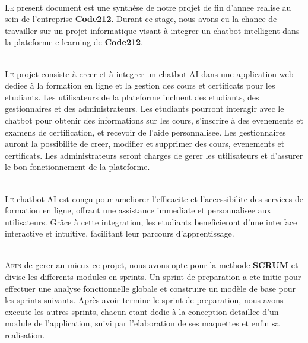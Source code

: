 \documentclass[a4paper, 11pt, openany]{report}
\begin{document}
\ \\







\Newpage


\lettrine[nindent=0em, slope=-.5em]{\color{Eblue}L}{e} present document est une synthèse de notre projet de fin d’annee realise au sein de l'entreprise \textbf{Code212}. Durant ce stage, nous avons eu la chance de travailler sur un projet informatique visant à integrer un chatbot intelligent dans la plateforme e-learning de \textbf{Code212}.

\ \\

\lettrine[nindent=0em, slope=-.5em]{\color{Eblue}L}{e} projet consiste à creer et à integrer un chatbot AI dans une application web dediee à la formation en ligne et la gestion des cours et certificats pour les etudiants. Les utilisateurs de la plateforme incluent des etudiants, des gestionnaires et des administrateurs. Les etudiants pourront interagir avec le chatbot pour obtenir des informations sur les cours, s'inscrire à des evenements et examens de certification, et recevoir de l'aide personnalisee. Les gestionnaires auront la possibilite de creer, modifier et supprimer des cours, evenements et certificats. Les administrateurs seront charges de gerer les utilisateurs et d'assurer le bon fonctionnement de la plateforme.

\ \\

\lettrine[nindent=0em, slope=-.5em]{\color{Eblue}L}{e} chatbot AI est conçu pour ameliorer l'efficacite et l'accessibilite des services de formation en ligne, offrant une assistance immediate et personnalisee aux utilisateurs. Grâce à cette integration, les etudiants beneficieront d'une interface interactive et intuitive, facilitant leur parcours d'apprentissage.

\ \\

\lettrine[nindent=0em, slope=-.5em]{\color{Eblue}A}{fin} de gerer au mieux ce projet, nous avons opte pour la methode \textbf{SCRUM} et divise les differents modules en sprints. Un sprint de preparation a ete initie pour effectuer une analyse fonctionnelle globale et construire un modèle de base pour les sprints suivants. Après avoir termine le sprint de preparation, nous avons execute les autres sprints, chacun etant dedie à la conception detaillee d’un module de l’application, suivi par l'elaboration de ses maquettes et enfin sa realisation.
\end{document}
